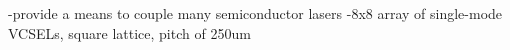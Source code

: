 \cite{mots2019}

\cite{fesh2017}

\cite{kahi2003}

\cite{mo2000}

\cite{kyle2008}

\cite{hasl2018}

\cite{vabr2017}

\cite{brfi2015}
-provide a means to couple many semiconductor lasers
-8x8 array of single-mode VCSELs, square lattice, pitch of 250um

\cite{padu2012}